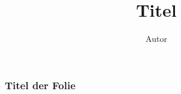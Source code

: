 \documentclass{beamer}
\title{Titel}
\author{Autor}
\date{}
\begin{document}
\begin{frame}
    \titlepage
\end{frame}

\begin{frame}
    \frametitle{Titel der Folie}
\end{frame}
\end{document}
